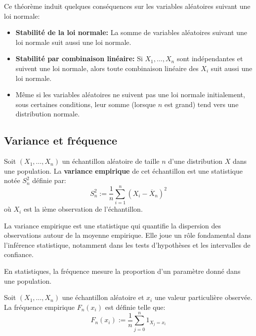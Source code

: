 \begin{prop}[Conséquences]
    Ce théorème induit quelques conséquences sur les variables aléatoires suivant une loi normale: 
    \begin{itemize}
        \item \textbf{Stabilité de la loi normale:} La somme de variables aléatoires suivant une loi 
            normale suit aussi une loi normale. 
        \item \textbf{Stabilité par combinaison linéaire: }Si $X_1, \dots, X_n$ sont indépendantes et suivent une loi normale, alors toute 
             combinaison linéaire des $X_i$ suit aussi une loi normale. 
        \item Même si les variables aléatoires ne suivent pas une loi normale initialement, 
            sous certaines conditions, leur somme (lorsque $n$ est grand) tend vers une distribution normale.
    \end{itemize}
\end{prop}

\subsection{Variance et fréquence}

\begin{definition}
    Soit $(X_1, \dots, X_n)$ un échantillon aléatoire de taille $n$ d'une distribution $X$ dans une population. 
    La \textbf{variance empirique} de cet échantillon est une statistique notée $S_n^2$ définie par: 
        \[ \boxed{
            S_n^2 := \frac{1}{n} \sum_{i=1}^{n} (X_i - \overline{X}_n)^2 
        } \] 
    où $X_i$ est la ième observation de l'échantillon. 
\end{definition}

\begin{remark}[Interprétation]
    La variance empirique est une statistique qui quantifie la dispersion des observations
     autour de la moyenne empirique. Elle joue un rôle fondamental dans l'inférence statistique, 
     notamment dans les tests d'hypothèses et les intervalles de confiance.
\end{remark}

En statistiques, la fréquence mesure la proportion d'un paramètre donné dans une population. 

\newpage 

\begin{definition}
    Soit $(X_1, \dots, X_n)$ une échantillon aléatoire et $x_i$ une valeur particulière observée. 
    La fréquence empirique $F_n(x_i)$ est définie telle que: 
        \[ F_n(x_i) := \frac{1}{n} \sum_{j=0}^{n} 1_{X_j = x_i} \] 
\end{definition}

